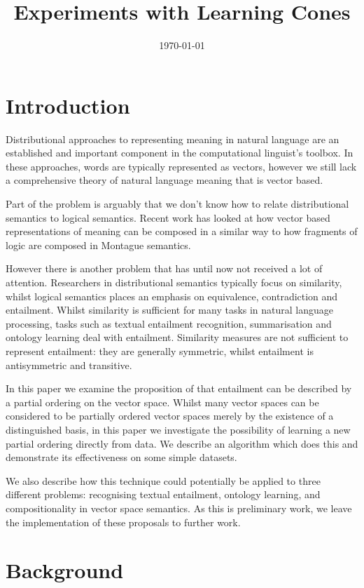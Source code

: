\documentclass{article}
\title{Experiments with Learning Cones}
\date{\today}
\begin{document}
\maketitle

\section{Introduction}

Distributional approaches to representing meaning in natural language
are an established and important component in the computational
linguist's toolbox. In these approaches, words are typically
represented as vectors, however we still lack a comprehensive theory
of natural language meaning that is vector based.

Part of the problem is arguably that we don't know how to relate
distributional semantics to logical semantics. Recent work has looked
at how vector based representations of meaning can be composed in a
similar way to how fragments of logic are composed in Montague
semantics.

However there is another problem that has until now not received a lot
of attention. Researchers in distributional semantics typically focus
on similarity, whilst logical semantics places an emphasis on
equivalence, contradiction and entailment. Whilst similarity is
sufficient for many tasks in natural language processing, tasks such
as textual entailment recognition, summarisation and ontology learning
deal with entailment. Similarity measures are not sufficient to
represent entailment: they are generally symmetric, whilst entailment
is antisymmetric and transitive.

In this paper we examine the proposition of  that
entailment can be described by a partial ordering on the vector
space. Whilst many vector spaces can be considered to be partially
ordered vector spaces merely by the existence of a distinguished
basis, in this paper we investigate the possibility of learning a new
partial ordering directly from data. We describe an algorithm which
does this and demonstrate its effectiveness on some simple datasets.

We also describe how this technique could potentially be applied to
three different problems: recognising textual entailment, ontology
learning, and compositionality in vector space semantics. As this is
preliminary work, we leave the implementation of these proposals to
further work.

\section{Background}
\end{document}
